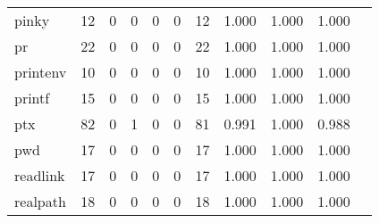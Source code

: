 \begin{longtable}{lp{1.10cm}p{1.10cm}p{1.10cm}p{1.10cm}p{1.10cm}p{1.10cm}p{1.10cm}p{1.10cm}p{1.10cm}p{1.10cm}}
pinky     &                     12 &                                  0 &                                 0 &                                0 &                                 0 &                              12 &                          1.000 &                                 1.000 &                               1.000 \\
pr        &                     22 &                                  0 &                                 0 &                                0 &                                 0 &                              22 &                          1.000 &                                 1.000 &                               1.000 \\
printenv  &                     10 &                                  0 &                                 0 &                                0 &                                 0 &                              10 &                          1.000 &                                 1.000 &                               1.000 \\
printf    &                     15 &                                  0 &                                 0 &                                0 &                                 0 &                              15 &                          1.000 &                                 1.000 &                               1.000 \\
ptx       &                     82 &                                  0 &                                 1 &                                0 &                                 0 &                              81 &                          0.991 &                                 1.000 &                               0.988 \\
pwd       &                     17 &                                  0 &                                 0 &                                0 &                                 0 &                              17 &                          1.000 &                                 1.000 &                               1.000 \\
readlink  &                     17 &                                  0 &                                 0 &                                0 &                                 0 &                              17 &                          1.000 &                                 1.000 &                               1.000 \\
realpath  &                     18 &                                  0 &                                 0 &                                0 &                                 0 &                              18 &                          1.000 &                                 1.000 &                               1.000 \\

\end{longtable}
